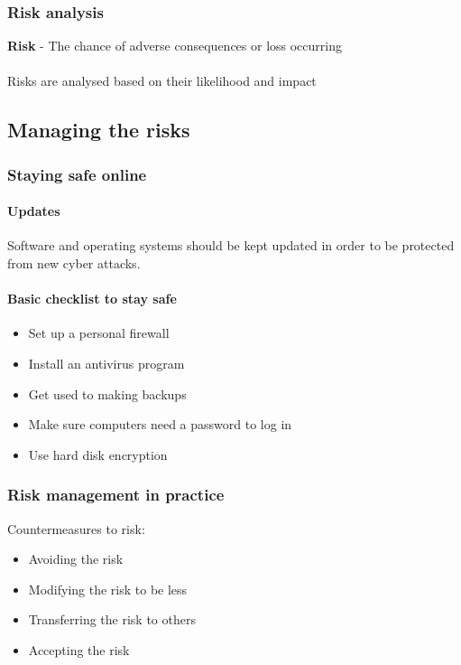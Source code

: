 \documentclass{article}[18pt]
\begin{document}
\subsubsection{Risk analysis}
\textbf{Risk} - The chance of adverse consequences or loss occurring\\
\\
Risks are analysed based on their likelihood and impact
\subsection{Managing the risks}
\subsubsection{Staying safe online}
\paragraph{Updates}
Software and operating systems should be kept updated in order to be protected from new cyber attacks.
\paragraph{Basic checklist to stay safe}
\begin{itemize}
\item Set up a personal firewall
\item Install an antivirus program
\item Get used to making backups
\item Make sure computers need a password to log in
\item Use hard disk encryption
\end{itemize}
\subsubsection{Risk management in practice}
Countermeasures to risk:
\begin{itemize}
\item Avoiding the risk
\item Modifying the risk to be less
\item Transferring the risk to others
\item Accepting the risk
\end{itemize}
\end{document}
